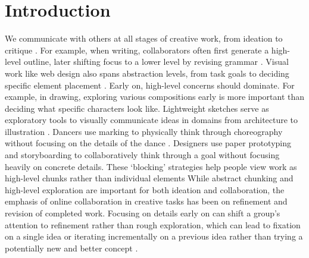 \section{Introduction}
We communicate with others at all stages of creative work, from ideation to critique \cite{mamykina2002collaborative}. 
For example, when writing, collaborators often first generate a high-level outline, later shifting focus to a lower level by revising grammar \cite{sommers1980revision}. Visual work like web design also spans abstraction levels, from task goals to deciding specific element placement \cite{klemmer2001designers}. Early on, high-level concerns should dominate. For example, in drawing, exploring various compositions early is more important than deciding what specific characters look like. Lightweight sketches serve as exploratory tools to visually communicate ideas in domains from architecture to illustration \cite{Buxton2007,Tversky2011,Tversky2009}. Dancers use marking to physically think through choreography without focusing on the details of the dance \cite{kirsh2011marking}. Designers use paper prototyping \cite{Snyder2003} and storyboarding \cite{landay1996sketching} to collaboratively think through a goal without focusing heavily on concrete details. These `blocking' strategies help people view work as high-level chunks rather than individual elements \cite{Chase1973,Gobet1998,chi1981categorization} While abstract chunking and high-level exploration are important for both ideation and collaboration, the emphasis of online collaboration in creative tasks has been on refinement and revision of completed work. Focusing on details early on can shift a group's attention to refinement rather than rough exploration, which can lead to fixation on a single idea \cite{jansson1991design,simon1972theories} or iterating incrementally on a previous idea rather than trying a potentially new and better concept \cite{Dow2009,Little2010,Yu2016}. 

